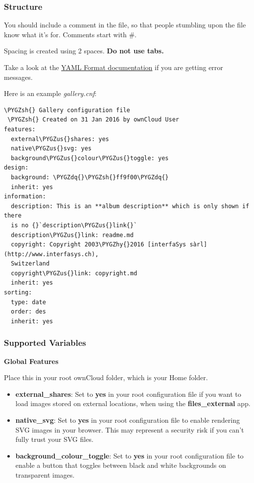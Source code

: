 \documentclass[letterpaper,10pt,english]{sphinxmanual}
\def\PYGZus{\char`\_}
\def\PYGZsh{\char`\#}
\def\PYGZhy{\char`\-}
\def\PYGZdq{\char`\"}
\begin{document}
\subsubsection{Structure}
\label{files/gallery_app:structure}
You should include a comment in the file, so that people stumbling upon
the file know what it's for. Comments start with \#.

Spacing is created using 2 spaces. \textbf{Do not use tabs.}

Take a look at the \href{http://symfony.com/doc/current/components/yaml/yaml\_format.html}{YAML Format documentation} if you are
getting error messages.

Here is an example \emph{gallery.cnf}:

\begin{Verbatim}[commandchars=\\\{\}]
 \PYGZsh{} Gallery configuration file
 \PYGZsh{} Created on 31 Jan 2016 by ownCloud User
features:
  external\PYGZus{}shares: yes
  native\PYGZus{}svg: yes
  background\PYGZus{}colour\PYGZus{}toggle: yes
design:
  background: \PYGZdq{}\PYGZsh{}ff9f00\PYGZdq{}
  inherit: yes
information:
  description: This is an **album description** which is only shown if there
  is no {}`description\PYGZus{}link{}`
  description\PYGZus{}link: readme.md
  copyright: Copyright 2003\PYGZhy{}2016 [interfaSys sàrl](http://www.interfasys.ch),
  Switzerland
  copyright\PYGZus{}link: copyright.md
  inherit: yes
sorting:
  type: date
  order: des
  inherit: yes
\end{Verbatim}


\subsubsection{Supported Variables}
\label{files/gallery_app:supported-variables}\label{files/gallery_app:supported-variables-label}
\textbf{Global Features}

Place this in your root ownCloud folder, which is your Home folder.
\begin{itemize}
\item {} 
\textbf{external\_shares}: Set to \textbf{yes} in your root configuration file if you
want to load images stored on external locations, when using the
\textbf{files\_external} app.

\item {} 
\textbf{native\_svg}: Set to \textbf{yes} in your root configuration file to enable
rendering SVG images in your browser. This may represent a security risk if
you can't fully trust your SVG files.

\item {} 
\textbf{background\_colour\_toggle}: Set to \textbf{yes} in your root configuration file
to enable a button that toggles between black and white backgrounds on
transparent images.

\end{itemize}
\end{document}
